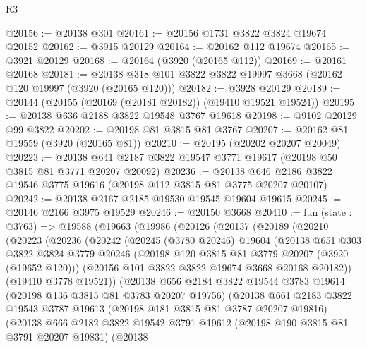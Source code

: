 \begin{lexlean}{R3}
\begin{coremodule}
@20156 := @20138 @301
@20161 := @20156 @1731 @3822 @3824 @19674 @20152
@20162 := @3915 @20129
@20164 := @20162 @112 @19674
@20165 := @3921 @20129
@20168 := @20164 (@3920 (@20165 @112))
@20169 := @20161 @20168
@20181 := @20138 @318 @101 @3822 @3822 @19997 @3668 (@20162 @120 @19997 (@3920 (@20165 @120)))
@20182 := @3928 @20129
@20189 := @20144 (@20155 (@20169 (@20181 @20182)) (@19410 @19521 @19524))
@20195 := @20138 @636 @2188 @3822 @19548 @3767 @19618
@20198 := @9102 @20129 @99 @3822
@20202 := @20198 @81 @3815 @81 @3767
@20207 := @20162 @81 @19559 (@3920 (@20165 @81))
@20210 := @20195 (@20202 @20207 @20049)
@20223 := @20138 @641 @2187 @3822 @19547 @3771 @19617 (@20198 @50 @3815 @81 @3771 @20207 @20092)
@20236 := @20138 @646 @2186 @3822 @19546 @3775 @19616 (@20198 @112 @3815 @81 @3775 @20207 @20107)
@20242 := @20138 @2167 @2185 @19530 @19545 @19604 @19615
@20245 := @20146 @2166 @3975 @19529
@20246 := @20150 @3668
@20410 := fun (state : @3763) =>
  @19588
    (@19663
      (@19986
        (@20126
          (@20137
            (@20189
              (@20210
                (@20223
                  (@20236
                    (@20242
                      (@20245
                        (@3780 @20246)
                        @19604
                        (@20138
                          @651
                          @303
                          @3822
                          @3824
                          @3779
                          @20246
                          (@20198 @120 @3815 @81 @3779 @20207 (@3920 (@19652 @120)))
                          (@20156 @101 @3822 @3822 @19674 @3668 @20168 @20182))
                        (@19410 @3778 @19521))
                      (@20138
                        @656
                        @2184
                        @3822
                        @19544
                        @3783
                        @19614
                        (@20198 @136 @3815 @81 @3783 @20207 @19756)
                        (@20138
                          @661
                          @2183
                          @3822
                          @19543
                          @3787
                          @19613
                          (@20198 @181 @3815 @81 @3787 @20207 @19816)
                          (@20138
                            @666
                            @2182
                            @3822
                            @19542
                            @3791
                            @19612
                            (@20198 @190 @3815 @81 @3791 @20207 @19831)
                            (@20138

\end{coremodule}
\end{lexlean}
